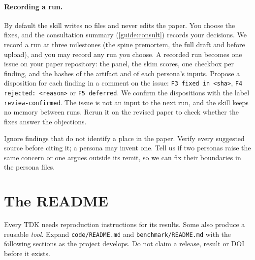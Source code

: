 \paragraph{Recording a run.} By default the skill writes no files and never edits the paper. You choose the fixes, and the consultation summary (\cref{guide:consult}) records your decisions. We record a run at three milestones (the spine premortem, the full draft and before upload), and you may record any run you choose. A recorded run becomes one issue on your paper repository: the panel, the skim scores, one checkbox per finding, and the hashes of the artifact and of each persona's inputs. Propose a disposition for each finding in a comment on the issue: \texttt{F3 fixed in <sha>}, \texttt{F4 rejected: <reason>} or \texttt{F5 deferred}. We confirm the dispositions with the label \texttt{review-confirmed}. The issue is not an input to the next run, and the skill keeps no memory between runs. Rerun it on the revised paper to check whether the fixes answer the objections.

Ignore findings that do not identify a place in the paper. Verify every suggested source before citing it; a persona may invent one. Tell us if two personas raise the same concern or one argues outside its remit, so we can fix their boundaries in the persona files.

\section{The README}\label{guide:code:readme}
Every TDK needs reproduction instructions for its results. Some also produce a reusable \emph{tool}. Expand \texttt{code/README.md} and \texttt{benchmark/README.md} with the following sections as the project develops. Do not claim a release, result or DOI before it exists.

